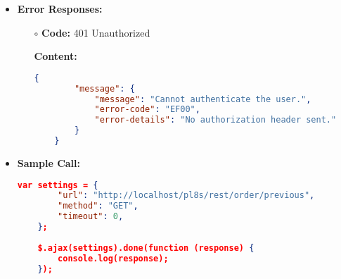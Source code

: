 \begin{itemize}
\begin{itemize}
\begin{lstlisting}[language=json]
			\end{lstlisting}
		\end{itemize}
	   \item \textbf{Error Responses:}
    	\begin{itemize}
			\item[$\circ$] \textbf{Code:} 401 Unauthorized
			\item[] \textbf{Content:}
			\begin{lstlisting}[language=json]
	{
		"message": {
			"message": "Cannot authenticate the user.",
			"error-code": "EF00",
			"error-details": "No authorization header sent."
		}
	}
			\end{lstlisting}
		\end{itemize}
    					
    \item \textbf{Sample Call:}
		\begin{lstlisting}[language=json]		
	var settings = {
		"url": "http://localhost/pl8s/rest/order/previous",
		"method": "GET",
		"timeout": 0,
	};
	
	$.ajax(settings).done(function (response) {
		console.log(response);
	});
	\end{lstlisting}
  \end{itemize}		
